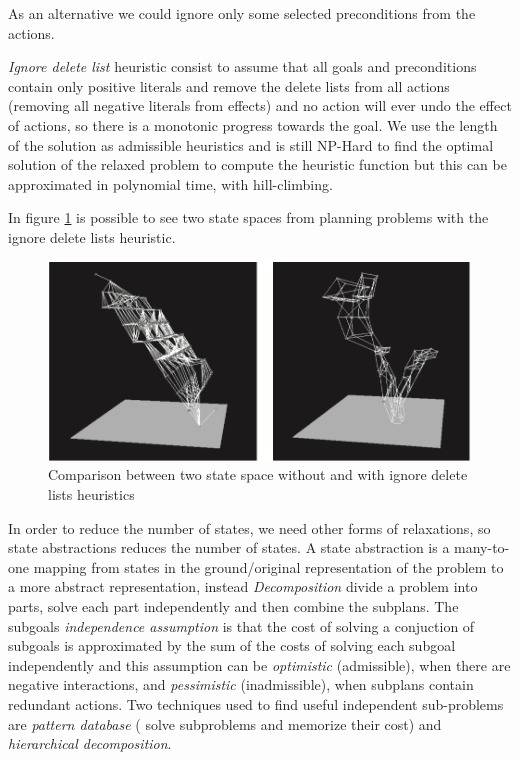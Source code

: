 As an alternative we could ignore only some selected preconditions from the actions.

\emph{Ignore delete list} heuristic consist to assume that all goals and preconditions contain
only positive literals and remove the delete lists from all actions (removing all negative
literals from effects) and no action will ever undo the effect of actions, so there is a 
monotonic progress towards the goal.\newline
We use the length of the solution as admissible heuristics and is still NP-Hard to find the 
optimal solution of the relaxed problem to compute the heuristic function but this can 
be approximated in polynomial time, with hill-climbing.

In figure \ref{img:ignoreDeleteEx} is possible to see two state spaces from planning problems
with the ignore delete lists heuristic.

\begin{figure}
	\includegraphics[width=\textwidth]{Images/ignoreDeleteEx}
	\caption{Comparison between two state space without and with ignore delete lists heuristics}
	\label{img:ignoreDeleteEx}
\end{figure}
In order to reduce the number of states, we need other forms of relaxations, so state abstractions
reduces the number of states.\newline
A state abstraction is a many-to-one mapping from states in the ground/original representation
of the problem to a more abstract representation, instead \emph{Decomposition} divide a problem
into parts, solve each part independently and then combine the subplans.\newline
The subgoals \emph{independence assumption} is that the cost of solving a conjuction of 
subgoals is approximated by the sum of the costs of solving each subgoal independently and 
this assumption can be \emph{optimistic} (admissible), when there are negative interactions,
and \emph{pessimistic} (inadmissible), when subplans contain redundant actions.\newline
Two techniques used to find useful independent sub-problems are \emph{pattern database} (
solve subproblems and memorize their cost) and \emph{hierarchical decomposition}.

